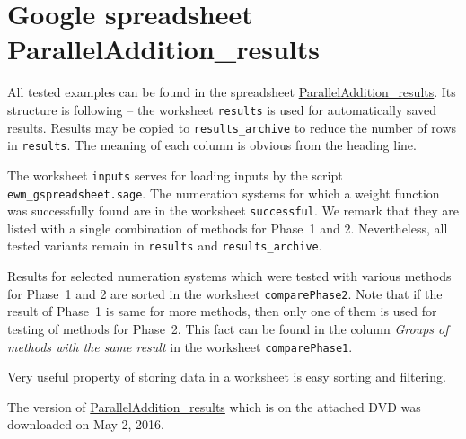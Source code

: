 \section{Google spreadsheet ParallelAddition\_results}
\label{sec:gspreadsheet}
All tested examples can be found in the spreadsheet \href{https://docs.google.com/spreadsheets/d/1TnhrHdefHfHa0WSeVs4q6XVj3epjPlPlnoekE0E1xeM/edit?usp=sharing}{ParallelAddition\_results}. Its structure is following -- the worksheet \verb+results+ is used for automatically saved results. Results may be copied to \verb+results_archive+ to reduce the number of rows in \verb+results+. The meaning of each column is obvious from the heading line. 

The worksheet \verb+inputs+ serves for loading inputs by the script \verb+ewm_gspreadsheet.sage+. The numeration systems for which a weight function was successfully found are in the worksheet \verb+successful+. We remark that they are listed with a single combination of methods for Phase~1 and 2. Nevertheless, all tested variants remain in \verb+results+ and \verb+results_archive+. 

Results for selected numeration systems which were tested with various  methods for Phase~1 and 2 are sorted in the worksheet \verb+comparePhase2+. Note that if the result of Phase~1 is same for more methods, then only one of them is used for testing of methods for Phase~2. This fact can be found in the column \emph{Groups of methods with the same result} in the worksheet \verb+comparePhase1+.

Very useful property of storing data in a worksheet is easy sorting and filtering.

The version of \href{https://docs.google.com/spreadsheets/d/1TnhrHdefHfHa0WSeVs4q6XVj3epjPlPlnoekE0E1xeM/edit?usp=sharing}{ParallelAddition\_results} which is on the attached DVD was downloaded on May 2, 2016.
